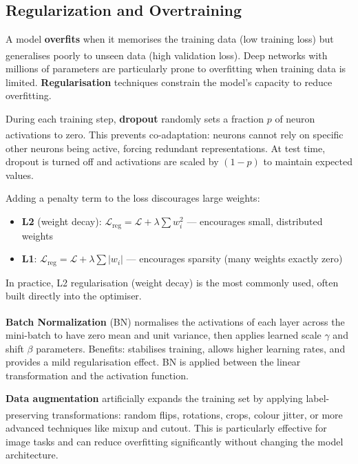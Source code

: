 \subsection{Regularization and Overtraining}

\begin{tcbitemize}[ skin=sectionraster ]
    \tcbitem[title={Overfitting}, raster multicolumn=6]
    A model \textbf{overfits} when it memorises the training data (low training loss) but generalises poorly to unseen data (high validation loss)\textsuperscript{\cite[][pp.~27--29]{fleuretLittleBookDeep}}.
    Deep networks with millions of parameters are particularly prone to overfitting when training data is limited.
    \textbf{Regularisation} techniques constrain the model's capacity to reduce overfitting.

    \tcbitem[title={Dropout}, raster multicolumn=3]
    During each training step, \textbf{dropout} randomly sets a fraction $p$ of neuron activations to zero\textsuperscript{\cite[][p.~28]{fleuretLittleBookDeep}}.
    This prevents co-adaptation: neurons cannot rely on specific other neurons being active, forcing redundant representations.
    At test time, dropout is turned off and activations are scaled by $(1 - p)$ to maintain expected values.

    \tcbitem[title={Weight Regularisation}, raster multicolumn=3]
    Adding a penalty term to the loss discourages large weights:
    \begin{itemize}
        \item \textbf{L2} (weight decay): $\mathcal{L}_{\mathrm{reg}} = \mathcal{L} + \lambda \sum w_i^2$ --- encourages small, distributed weights
        \item \textbf{L1}: $\mathcal{L}_{\mathrm{reg}} = \mathcal{L} + \lambda \sum |w_i|$ --- encourages sparsity (many weights exactly zero)
    \end{itemize}
    In practice, L2 regularisation (weight decay) is the most commonly used, often built directly into the optimiser.

    \tcbitem[title={Batch Normalization}, raster multicolumn=3]
    \textbf{Batch Normalization} (BN)\textsuperscript{\cite[][]{ioffeBatchNormalizationAccelerating2015}} normalises the activations of each layer across the mini-batch to have zero mean and unit variance, then applies learned scale $\gamma$ and shift $\beta$ parameters.
    Benefits: stabilises training, allows higher learning rates, and provides a mild regularisation effect.
    BN is applied between the linear transformation and the activation function.

    \tcbitem[title={Data Augmentation}, raster multicolumn=3]
    \textbf{Data augmentation} artificially expands the training set by applying label-preserving transformations\textsuperscript{\cite[][p.~29]{fleuretLittleBookDeep}}:
    random flips, rotations, crops, colour jitter, or more advanced techniques like mixup and cutout.
    This is particularly effective for image tasks and can reduce overfitting significantly without changing the model architecture.
\end{tcbitemize}


